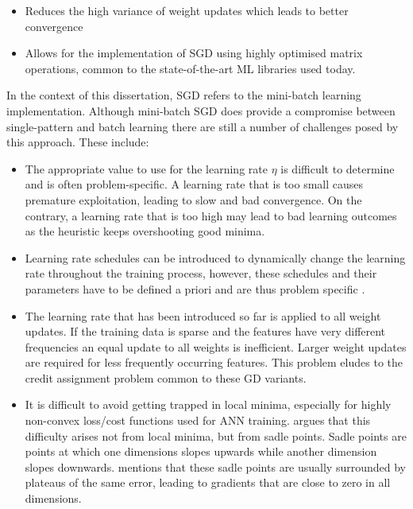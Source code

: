 \begin{itemize}
      \item Reduces the high variance of weight updates which leads to better convergence
      \item Allows for the implementation of \ac{SGD} using highly optimised matrix operations, common to the state-of-the-art \ac{ML} libraries used today.
\end{itemize}

In the context of this dissertation, \ac{SGD} refers to the mini-batch learning implementation. Although mini-batch \ac{SGD} does provide a compromise between single-pattern and batch learning there are still a number of challenges posed by this approach. These include:

\begin{itemize}
      \item The appropriate value to use for the learning rate $\eta$ is difficult to determine and is often problem-specific. A learning rate that is too small causes premature exploitation, leading to slow and bad convergence. On the contrary, a learning rate that is too high may lead to bad learning outcomes as the heuristic keeps overshooting good minima.

      \item Learning rate schedules \cite{ref:robbins:1951} can be introduced to dynamically change the learning rate throughout the training process, however, these schedules and their parameters have to be defined a priori and are thus problem specific \cite{ref:darken:1992}.

      \item The learning rate that has been introduced so far is applied to all weight updates. If the training data is sparse and the features have very different frequencies an equal update to all weights is inefficient. Larger weight updates are required for less frequently occurring features. This problem eludes to the credit assignment problem \cite{ref:rumelhart:1986} common to these \ac{GD} variants.

      \item It is difficult to avoid getting trapped in local minima, especially for highly non-convex loss/cost functions used for \ac{ANN} training. \cite{ref:dauphin:2014} argues that this difficulty arises not from local minima, but from sadle points. Sadle points are points at which one dimensions slopes upwards while another dimension slopes downwards. \cite{ref:ruder:2016} mentions that these sadle points are usually surrounded by plateaus of the same error, leading to gradients that are close to zero in all dimensions.
\end{itemize}


